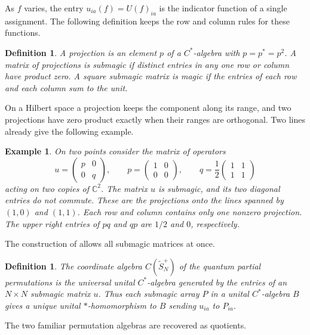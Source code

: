 \documentclass[11pt,a4paper]{article}
\newtheorem{defn}[thm]{Definition}
\newtheorem{ex}[thm]{Example}
\begin{document}
As $f$ varies, the entry $u_{ia}(f)=U(f)_{ia}$ is the indicator function of a single assignment. The following definition keeps the row and column rules for these functions.

\begin{defn}\label{submagic}
A projection is an element $p$ of a $C^*$-algebra with $p=p^*=p^2$. A matrix of projections is submagic if distinct entries in any one row or column have product zero. A square submagic matrix is magic if the entries of each row and each column sum to the unit.
\end{defn}

On a Hilbert space a projection keeps the component along its range, and two projections have zero product exactly when their ranges are orthogonal. Two lines already give the following example.

\begin{ex}\label{lines}
On two points consider the matrix of operators
\[
 u=\begin{pmatrix}p&0\\0&q\end{pmatrix},\qquad
 p=\begin{pmatrix}1&0\\0&0\end{pmatrix},\qquad
 q=\frac12\begin{pmatrix}1&1\\1&1\end{pmatrix}
\]
acting on two copies of $\mathbb C^2$. The matrix $u$ is submagic, and its two diagonal entries do not commute. These are the projections onto the lines spanned by $(1,0)$ and $(1,1)$. Each row and column contains only one nonzero projection. The upper right entries of $pq$ and $qp$ are $1/2$ and $0$, respectively.
\end{ex}

The construction of \cite{bs} allows all submagic matrices at once.

\begin{defn}
The coordinate algebra $C(\widetilde S_N^+)$ of the quantum partial permutations is the universal unital $C^*$-algebra generated by the entries of an $N\times N$ submagic matrix $u$. Thus each submagic array $P$ in a unital $C^*$-algebra $B$ gives a unique unital $*$-homomorphism to $B$ sending $u_{ia}$ to $P_{ia}$.
\end{defn}

The two familiar permutation algebras are recovered as quotients.
\end{document}
